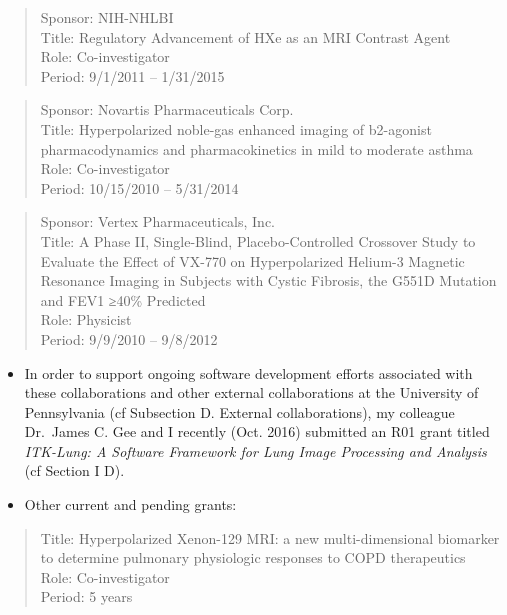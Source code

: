 \documentclass[11pt,]{article}
\begin{document}
\begin{itemize}
  \begin{quote}
  Sponsor: NIH-NHLBI\\
  Title: Regulatory Advancement of HXe as an MRI Contrast Agent\\
  Role: Co-investigator\\
  Period: 9/1/2011 -- 1/31/2015
  \end{quote}

  \begin{quote}
  Sponsor: Novartis Pharmaceuticals Corp.\\
  Title: Hyperpolarized noble-gas enhanced imaging of b2-agonist
  pharmacodynamics and pharmacokinetics in mild to moderate asthma\\
  Role: Co-investigator\\
  Period: 10/15/2010 -- 5/31/2014
  \end{quote}

  \begin{quote}
  Sponsor: Vertex Pharmaceuticals, Inc.\\
  Title: A Phase II, Single-Blind, Placebo-Controlled Crossover Study to
  Evaluate the Effect of VX-770 on Hyperpolarized Helium-3 Magnetic
  Resonance Imaging in Subjects with Cystic Fibrosis, the G551D Mutation
  and FEV1 ≥40\% Predicted\\
  Role: Physicist\\
  Period: 9/9/2010 -- 9/8/2012
  \end{quote}

  \begin{itemize}
  \item
    In order to support ongoing software development efforts associated
    with these collaborations and other external collaborations at the
    University of Pennsylvania (cf Subsection D. External
    collaborations), my colleague Dr.~James C. Gee and I recently (Oct.
    2016) submitted an R01 grant titled \emph{ITK-Lung: A Software
    Framework for Lung Image Processing and Analysis} (cf Section I D).
  \item
    Other current and pending grants:
  \end{itemize}

  \begin{quote}
  Title: Hyperpolarized Xenon-129 MRI: a new multi-dimensional biomarker
  to determine pulmonary physiologic responses to COPD therapeutics\\
  Role: Co-investigator\\
  Period: 5 years
  \end{quote}


\end{itemize}
\end{document}
